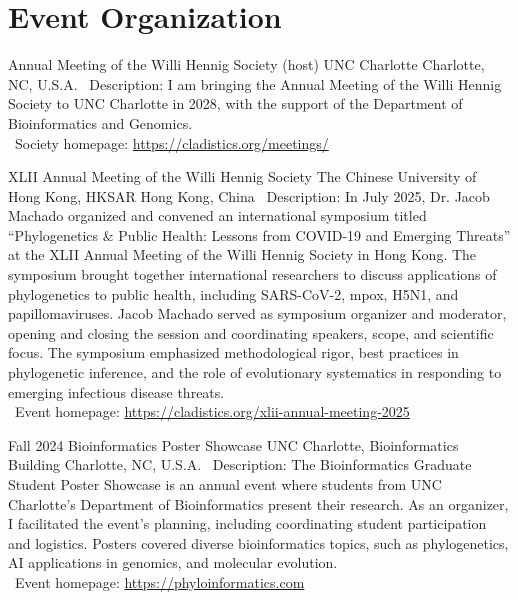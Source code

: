 \documentclass[11pt, letterpaper, sans]{moderncv}
\begin{document}

\section{Event Organization}

    {Annual Meeting of the Willi Hennig Society (host)}
    {UNC Charlotte}
    {Charlotte, NC, U.S.A.}
    {}
    {
        \textbullet~Description: I am bringing the Annual Meeting of the Willi Hennig Society to UNC Charlotte in 2028, with the support of the Department of Bioinformatics and Genomics.\\
        \textbullet~Society homepage: \url{https://cladistics.org/meetings/}
    }

    {XLII Annual Meeting of the Willi Hennig Society}
    {The Chinese University of Hong Kong, HKSAR}
    {Hong Kong, China}
    {}
    {
        \textbullet~Description: In July 2025, Dr. Jacob Machado organized and convened an international symposium titled ``Phylogenetics \& Public Health: Lessons from COVID-19 and Emerging Threats'' at the XLII Annual Meeting of the Willi Hennig Society in Hong Kong. The symposium brought together international researchers to discuss applications of phylogenetics to public health, including SARS-CoV-2, mpox, H5N1, and papillomaviruses. Jacob Machado served as symposium organizer and moderator, opening and closing the session and coordinating speakers, scope, and scientific focus. The symposium emphasized methodological rigor, best practices in phylogenetic inference, and the role of evolutionary systematics in responding to emerging infectious disease threats.\\
        \textbullet~Event homepage: \url{https://cladistics.org/xlii-annual-meeting-2025}
    }

    {Fall 2024 Bioinformatics Poster Showcase}
    {UNC Charlotte, Bioinformatics Building}
    {Charlotte, NC, U.S.A.}
    {}
    {
        \textbullet~Description: The Bioinformatics Graduate Student Poster Showcase is an annual event where students from UNC Charlotte's Department of Bioinformatics present their research. As an organizer, I facilitated the event’s planning, including coordinating student participation and logistics. Posters covered diverse bioinformatics topics, such as phylogenetics, AI applications in genomics, and molecular evolution.\\
        \textbullet~Event homepage: \url{https://phyloinformatics.com}
    }
\end{document}
